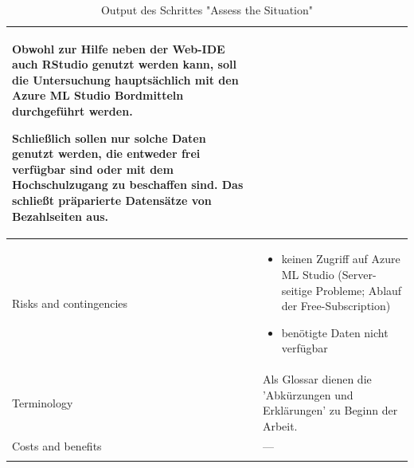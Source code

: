 \begin{centering}
\begin{longtable}[H]{|p{3cm}|p{13cm}|}
Obwohl zur Hilfe neben der Web-IDE auch RStudio genutzt werden kann, soll die Untersuchung hauptsächlich mit den Azure ML Studio Bordmitteln durchgeführt werden. \par
Schließlich sollen nur solche Daten genutzt werden, die entweder frei verfügbar sind oder mit dem Hochschulzugang zu beschaffen sind. Das schließt präparierte Datensätze von Bezahlseiten aus.\\
\hline
Risks and contingencies & \begin{itemize}
\item keinen Zugriff auf Azure ML Studio (Server-seitige Probleme; Ablauf der Free-Subscription)
\item benötigte Daten nicht verfügbar
\end{itemize} \\
\hline
Terminology & Als Glossar dienen die 'Abkürzungen und Erklärungen' zu Beginn der Arbeit. \\
\hline
Costs and benefits & --- \\
\hline
\caption{Output des Schrittes "Assess the Situation"}
\end{longtable} \end{centering}


